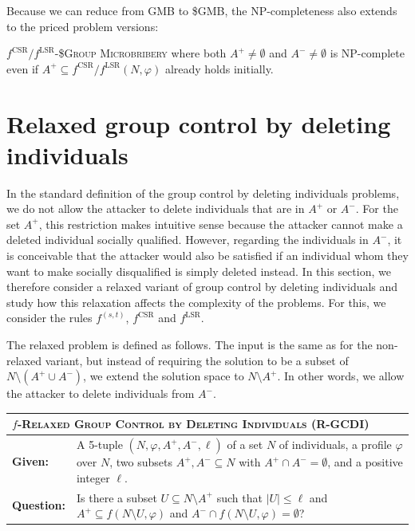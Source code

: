 \documentclass[
    12pt,               %
    a4paper,            %
    bibtotoc,           %
    pointlessnumbers,   %
    ngerman,            %
    titlepage,          %
    leqno,              %
    ]{scrarticle}       %
\begin{document}
Because we can reduce from GMB to \$GMB, the NP-completeness also extends to the priced problem versions:

\begin{Corollary} \label{cor:gmb_protective_instances_npc}
$f^{\text{CSR}} / f^{\text{LSR}}$-\textsc{\$Group Microbribery} where both $A^+ \neq \emptyset$ and $A^- \neq \emptyset$ is NP-complete even if $A^+ \subseteq f^{\text{CSR}} / f^{\text{LSR}}(N, \varphi)$ already holds initially.
\end{Corollary}










\clearpage

\section{Relaxed group control by deleting individuals}
\label{sec:relaxed_group_control_deleting}

In the standard definition of the group control by deleting individuals problems, we do not allow the attacker to delete individuals that are in $A^+$ or $A^-$. For the set $A^+$, this restriction makes intuitive sense because the attacker cannot make a deleted individual socially qualified. However, regarding the individuals in $A^-$, it is conceivable that the attacker would also be satisfied if an individual whom they want to make socially disqualified is simply deleted instead. In this section, we therefore consider a relaxed variant of group control by deleting individuals and study how this relaxation affects the complexity of the problems. For this, we consider the rules $f^{(s, t)}$, $f^{\text{CSR}}$ and $f^{\text{LSR}}$.

The relaxed problem is defined as follows. The input is the same as for the non-relaxed variant, but instead of requiring the solution to be a subset of $N \setminus (A^+ \cup A^-)$, we extend the solution space to $N \setminus A^+$. In other words, we allow the attacker to delete individuals from $A^-$.

\bigskip

\begin{tabularx}{\textwidth}{lX}
\hline
\multicolumn{2}{l}{
$f$-\textsc{Relaxed Group Control by Deleting Individuals} (R-GCDI)
} \\
\hline
\textbf{Given:} &
A 5-tuple $(N, \varphi, A^+, A^-, \ell)$ of a set $N$ of individuals, a profile $\varphi$ over $N$, two subsets $A^+, A^- \subseteq N$ with $A^+ \cap A^- = \emptyset$, and a positive integer $\ell$. \\
\textbf{Question:} &
Is there a subset $U \subseteq N \setminus A^+$ such that $|U| \leq \ell$ and $A^+ \subseteq f(N \setminus U, \varphi)$ and $A^- \cap f(N \setminus U, \varphi) = \emptyset$? \\
\hline
\end{tabularx}
\end{document}
